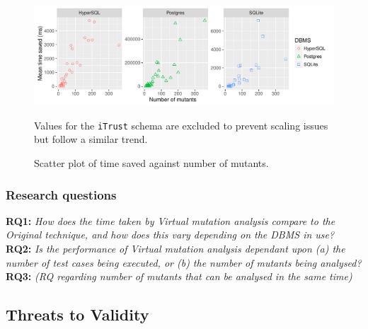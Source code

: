         \begin{figure}[t]
            \centering
            \includegraphics[width=6in]{graphics/time_saved_vs_mutants_scatter_noitrust_facetdbms.pdf}
            \caption{Scatter plot of time saved against number of mutants.}
            {\small Values for the \texttt{iTrust} schema are excluded to prevent scaling issues but follow a similar trend.}
        \end{figure}

        \subsubsection{Research questions}

            \textbf{RQ1: }\emph{How does the time taken by Virtual mutation analysis compare to the Original technique, and how does this vary depending on the DBMS in use?}\\


            \textbf{RQ2: }\emph{Is the performance of Virtual mutation analysis dependant upon (a) the number of test cases being executed, or (b) the number of mutants being analysed?}\\


            \textbf{RQ3: }\emph{(RQ regarding number of mutants that can be analysed in the same time)}\\


        

    \subsection{Threats to Validity}
